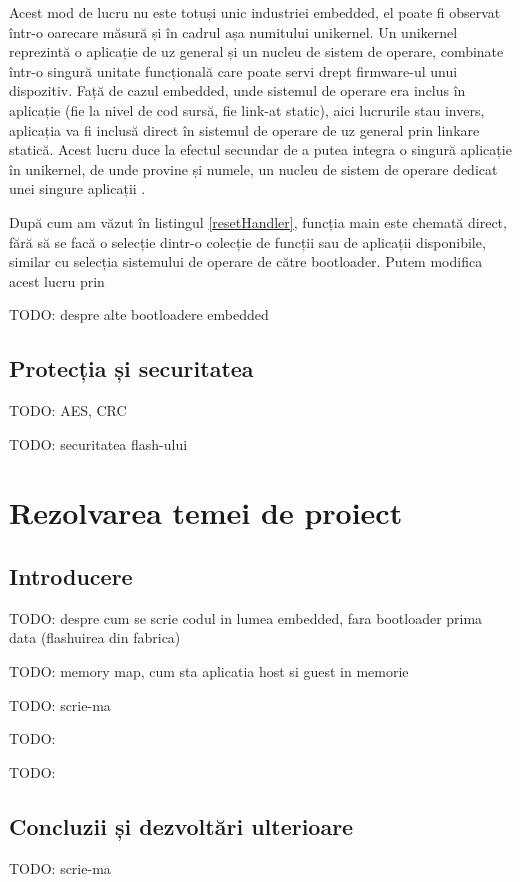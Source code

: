 \documentclass[12pt,a4paper,titlepage]{report}
\begin{document}
Acest mod de lucru nu este totuși unic industriei embedded, el poate fi observat într-o oarecare măsură și în cadrul așa numitului unikernel. Un unikernel reprezintă o aplicație de uz general \cite{barbu} și un nucleu de sistem de operare, combinate într-o singură unitate funcțională care poate servi drept firmware-ul unui dispozitiv. Față de cazul embedded, unde sistemul de operare era inclus în aplicație (fie la nivel de cod sursă, fie link-at static), aici lucrurile stau invers, aplicația va fi inclusă direct în sistemul de operare de uz general prin linkare statică. Acest lucru duce la efectul secundar de a putea integra o singură aplicație în unikernel, de unde provine și numele, un nucleu de sistem de operare dedicat unei singure aplicații \cite{kantee}.

După cum am văzut în listingul \ref{resetHandler}, funcția main este chemată direct, fără să se facă o selecție dintr-o colecție de funcții sau de aplicații disponibile, similar cu selecția sistemului de operare de către bootloader.
Putem modifica acest lucru prin

TODO: despre alte bootloadere embedded

\section{Protecția și securitatea}
TODO: AES, CRC


TODO: securitatea flash-ului

\newpage
\chapter{Rezolvarea temei de proiect}
\section{Introducere}

TODO: despre cum se scrie codul in lumea embedded, fara bootloader prima data (flashuirea din fabrica)

TODO: memory map, cum sta aplicatia host si guest in memorie

TODO: scrie-ma

TODO: %

TODO: %

\section{Concluzii și dezvoltări ulterioare}

TODO: scrie-ma


\newpage


\end{document}
